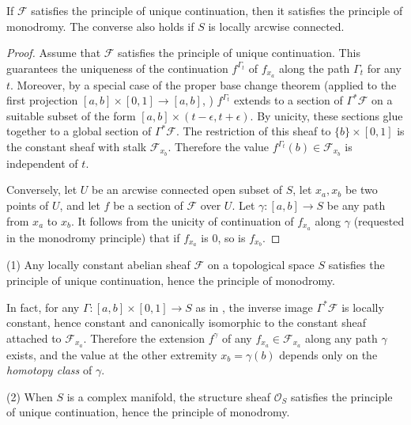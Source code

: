 \begin{pro}
 If $\mathcal{F}$ satisfies the principle of
 unique continuation, then it satisfies the principle of monodromy. 
 The converse also holds if
 $S$ is locally arcwise connected.
\end{pro}

\begin{proof}
 Assume that $\mathcal{F}$ satisfies the principle of
 unique continuation. This guarantees the uniqueness of the 
 continuation $f^{\Gamma_t}$ of
 $f_{x_a}$ along the path $\Gamma_t$ for any $t$. Moreover, by a 
 special case of the proper base change theorem
 (applied to the first projection $[a,b]\times [0,1]\rightarrow 
 [a,b]$, \cf \cite[IV, 1.4]{cos}) $f^{\Gamma_t}$
 extends to a section of
 $\Gamma^{\ast}
 \mathcal{F}$ on a suitable subset of the form $[a,b]\times 
 (t-\epsilon,t+\epsilon)$. By unicity, these sections glue
 together to a global section of $\Gamma^{\ast} \mathcal{F}$. The restriction 
 of this sheaf to
 $\{b\}\times [0,1]$ is the constant sheaf with stalk
 $\mathcal{F}_{x_b}$. Therefore the value 
 $f^{\Gamma_t}(b)\in \mathcal{F}_{x_b}$ is independent of $t$.

 Conversely, let $U$ be an arcwise connected open subset of $S$, let
 $x_a, x_b$ be two points of
 $U$, and let $f$ be a section of
 $\mathcal{F}$ over $U$. Let $\gamma: [a,b]\rightarrow S$ be any path from 
 $x_a$ to $ x_b$. It
 follows from the unicity of continuation of $f_{x_a}$ along $\gamma$ 
 (requested in the monodromy
 principle) that if $f_{x_a}$ is
 $0$, so is
 $f_{x_b}$.
\end{proof}

\begin{exa}\label{lem-homotopy}
  (1) Any locally constant abelian sheaf $\mathcal{F}$ on a
 topological space $S$ satisfies the principle of unique 
 continuation, hence the principle of monodromy.
 
 In fact, for any $\Gamma: [a,b]\times [0,1]\rightarrow S$ as in
 , the inverse image
 $\Gamma^{\ast}\mathcal{F}$ is locally constant, hence constant and 
 canonically isomorphic to the
 constant sheaf attached to
 $\mathcal{F}_{x_a}$. Therefore the extension $f^\gamma$ of any 
 $f_{x_a}\in \mathcal{F}_{x_a}$ along any
 path $\gamma$ exists, and the value at the other extremity 
 $x_b=\gamma(b)$ depends only on the
 \emph{homotopy class} of $\gamma$.

  (2) When $S$ is a complex manifold, the structure sheaf
 $\mathcal{O}_S$ satisfies the principle of unique continuation, hence
 the principle of monodromy.
\end{exa}


